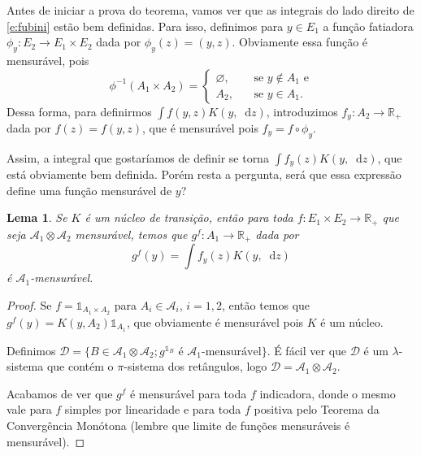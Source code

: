 \documentclass[reqno, final]{book}
\newcommand*\1{\mathds{1}}
\newtheorem{lemma}[theorem]{Lema}
\renewcommand*\d{\mathop{}\!\mathrm{d}}
\begin{document}
Antes de iniciar a prova do teorema, vamos ver que as integrais do lado direito de \eqref{e:fubini} estão bem definidas.
Para isso, definimos para $y \in E_1$ a função fatiadora $\phi_y: E_2 \to E_1 \times E_2$ dada por $\phi_y(z) = (y, z)$.
Obviamente essa função é mensurável, pois
\begin{equation}
  \phi^{-1}(A_1 \times A_2) =
  \begin{cases}
    \varnothing, \quad & \text{ se $y \not \in A_1$ e}\\
    A_2, & \text{ se $y \in A_1$}.
  \end{cases}
\end{equation}
Dessa forma, para definirmos $\int f(y,z) K(y, \d z)$, introduzimos $f_y: A_2 \to \mathbb{R}_+$ dada por $f(z) = f(y,z)$, que é mensurável pois $f_y = f \circ \phi_y$.

Assim, a integral que gostaríamos de definir se torna $\int f_y(z) K(y, \d z)$, que está obviamente bem definida.
Porém resta a pergunta, será que essa expressão define uma função mensurável de $y$?

\begin{lemma}
  Se $K$ é um núcleo de transição, então para toda $f: E_1 \times E_2 \to \mathbb{R}_+$ que seja $\mathcal{A}_1 \otimes \mathcal{A}_2$ mensurável, temos que $g^f:A_1 \to \mathbb{R}_+$ dada por
  \begin{equation}
    g^f(y) = \int f_y(z) K(y, \d z)
  \end{equation}
  é $\mathcal{A}_1$-mensurável.
\end{lemma}

\begin{proof}
  Se $f = \1_{A_1 \times A_2}$ para $A_i \in \mathcal{A}_i$, $i = 1,2$, então temos que $g^f(y) = K(y, A_2) \1_{A_1}$, que obviamente é mensurável pois $K$ é um núcleo.

  Definimos $\mathcal{D} = \{B \in \mathcal{A}_1 \otimes \mathcal{A}_2; g^{\1_B} \text{ é $\mathcal{A}_1$-mensurável}\}$.
  É fácil ver que $\mathcal{D}$ é um $\lambda$-sistema que contém o $\pi$-sistema dos retângulos, logo $\mathcal{D} = \mathcal{A}_1 \otimes \mathcal{A}_2$.

  Acabamos de ver que $g^f$ é mensurável para toda $f$ indicadora, donde o mesmo vale para $f$ simples por linearidade e para toda $f$ positiva pelo Teorema da Convergência Monótona (lembre que limite de funções mensuráveis é mensurável).
\end{proof}
\end{document}
